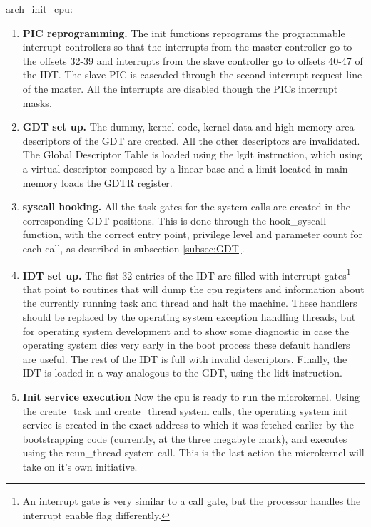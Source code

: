 \documentclass[11pt, letterpaper, twoside, english]{book}
\begin{document}
\textsf{arch\_init\_cpu}: 
\begin{enumerate}
\item[]\textbf{PIC reprogramming.} The init functions reprograms the programmable interrupt controllers so that the interrupts from the master controller go to the offsets 32-39 and interrupts from the slave controller go to offsets 40-47 of the IDT. The slave PIC is cascaded through the second interrupt request line of the master. All the interrupts are disabled though the PICs interrupt masks.
\item[]\textbf{GDT set up.} The dummy, kernel code, kernel data and high memory area descriptors of the GDT are created. All the other descriptors are invalidated. The Global Descriptor Table is loaded using the \textsf{lgdt} instruction, which using a virtual descriptor composed by a linear base and a limit located in main memory loads the GDTR register.
\item[]\textbf{syscall hooking.} All the task gates for the system calls are created in the corresponding GDT positions. This is done through the \textsf{hook\_syscall} function, with the correct entry point, privilege level and parameter count for each call, as described in subsection \ref{subsec:GDT}.
\item[]\textbf{IDT set up.} The fist 32 entries of the IDT are filled with interrupt gates\footnote{An interrupt gate is very similar to a call gate, but the processor handles the interrupt enable flag differently.} that point to routines that will dump the cpu registers and information about the currently running task and thread and halt the machine. These handlers should be replaced by the operating system exception handling threads, but for operating system development and to show some diagnostic in case the operating system dies very early in the boot process these default handlers are useful. The rest of the IDT is full with invalid descriptors. Finally, the IDT is loaded in a way analogous to the GDT, using the \textsf{lidt} instruction.
\item[]\textbf{Init service execution} Now the cpu is ready to run the microkernel. Using the \textsf{create\_task} and \textsf{create\_thread} system calls, the operating system init service is created in the exact address to which it was fetched earlier by the bootstrapping code (currently, at the three megabyte mark), and executes using the \textsf{reun\_thread} system call. This is the last action the microkernel will take on it's own initiative.
\end{enumerate}
\end{document}
